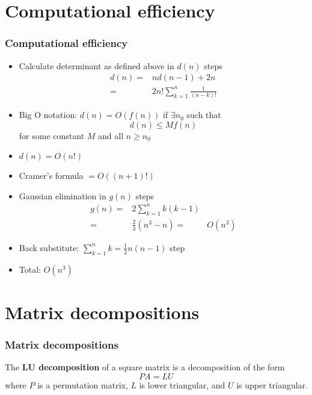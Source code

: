 \documentclass[compress]{beamer}
\theoremstyle{definition}
\begin{document}
\section{Computational efficiency}

\begin{frame}
  \frametitle{Computational efficiency}
  \begin{itemize}
  \item Calculate determinant as defined above in $d(n)$ steps
    \begin{align*}
      d(n) = & n d(n-1) + 2n  \\
      = & 2n! \sum_{k=1}^n \frac{1}{(n-k)!} 
    \end{align*}
  \item Big O notation: $d(n) = O(f(n))$ if $\exists n_0$ such
    that
    \[
    d(n) \leq M f(n) 
    \]
    for some constant $M$ and all $n \geq n_0$
  \item $d(n) = O(n!)$
  \item Cramer's formula $=O((n+1)!)$
  \end{itemize}
  
\end{frame}

\begin{frame}
  \begin{itemize}
  \item Gaussian elimination in $g(n)$ steps
    \begin{align*}
      g(n) = & 2 \sum_{k=1}^n k(k-1) \\
      = & \frac{2}{3} (n^3 - n)
      = & O(n^3)
    \end{align*}
  \item Back substitute: $\sum_{k=1}^n k = \frac{1}{2}
    n(n-1)$ step
  \item Total: $O(n^3)$
  \end{itemize}  
\end{frame}

\section{Matrix decompositions}
\begin{frame}
  \frametitle{Matrix decompositions}
  \begin{definition}
    The \textbf{LU decomposition} of a square matrix is a decomposition
    of the form
    \[ P A = L U \]
    where $P$ is a permutation matrix, $L$ is lower triangular, and $U$
    is upper triangular. 
  \end{definition}
\end{frame}
\end{document}

